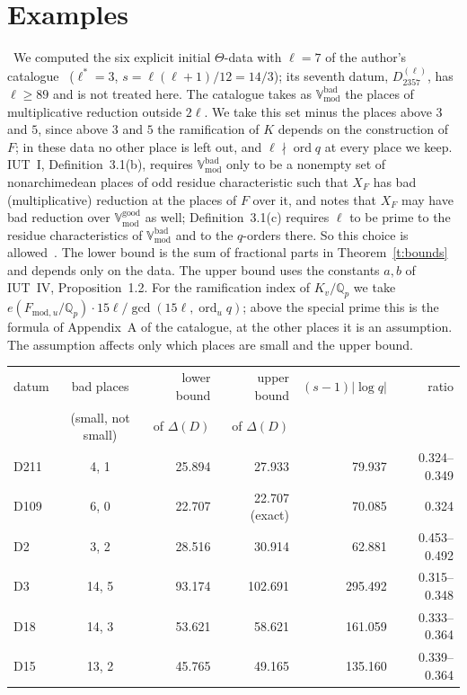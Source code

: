 \documentclass[11pt,a4paper]{article}
\newcommand{\Qp}{\mathbb{Q}_p}
\newcommand{\Vbad}{\mathbb{V}_{\mathrm{mod}}^{\mathrm{bad}}}
\newcommand{\lab}[2]{{\upshape\fcolorbox{#1}{#1!8}{\scriptsize\sffamily\bfseries\textcolor{#1}{#2}}}}
\newcommand{\tagP}{\lab{ForestGreen}{P}}
\theoremstyle{plain}
\theoremstyle{definition}
\theoremstyle{remark}
\begin{document}
\section{Examples}\label{s:examples}
\tagP\ We computed the six explicit initial $\Theta$-data with $\ell=7$ of the author's catalogue~\cite{Cat}
($\ell^*=3$, $s=\ell(\ell+1)/12=14/3$); its seventh datum, $D_{2357}^{(\ell)}$, has $\ell\ge89$ and is not treated
here. The catalogue takes as $\Vbad$ the places of multiplicative reduction outside $2\ell$. We take this set minus
the places above $3$ and $5$, since above $3$ and $5$ the ramification of $K$ depends on the construction of $F$; in
these data no other place is left out, and $\ell\nmid\operatorname{ord}q$ at every place we keep. IUT~I,
Definition~3.1(b), requires $\Vbad$ only to be a nonempty set of nonarchimedean places of odd residue characteristic
such that $X_F$ has bad (multiplicative) reduction at the places of $F$ over it, and notes that $X_F$ may have bad
reduction over $\mathbb{V}_{\mathrm{mod}}^{\mathrm{good}}$ as well; Definition~3.1(c) requires $\ell$ to be prime to
the residue characteristics of $\Vbad$ and to the $q$-orders there. So this choice is allowed~\cite{IUT1}. The lower bound is the sum of
fractional parts in Theorem~\ref{t:bounds} and depends only on the data. The upper bound uses the constants $a,b$ of
IUT~IV, Proposition~1.2. For the ramification index of $K_v/\Qp$ we take
$e(F_{\mathrm{mod},u}/\Qp)\cdot15\ell/\gcd(15\ell,\operatorname{ord}_uq)$; above the special prime this is the formula
of Appendix~A of the catalogue, at the other places it is an assumption. The assumption affects only which places are
small and the upper bound.

\begin{center}
\begin{tabular}{lcrrrr}
\toprule
datum & bad places & lower bound & upper bound & $(s-1)|\log q|$ & ratio\\
 & (small, not small) & of $\Delta(D)$ & of $\Delta(D)$ & & \\
\midrule
D211 & 4, 1 & 25.894 & 27.933 & 79.937 & 0.324--0.349\\
D109 & 6, 0 & 22.707 & 22.707 (exact) & 70.085 & 0.324\\
D2 & 3, 2 & 28.516 & 30.914 & 62.881 & 0.453--0.492\\
D3 & 14, 5 & 93.174 & 102.691 & 295.492 & 0.315--0.348\\
D18 & 14, 3 & 53.621 & 58.621 & 161.059 & 0.333--0.364\\
D15 & 13, 2 & 45.765 & 49.165 & 135.160 & 0.339--0.364\\
\bottomrule
\end{tabular}
\end{center}
\end{document}
